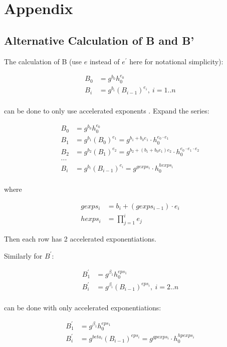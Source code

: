 \documentclass{article}
\begin{document}
\pagebreak

\section{Appendix}
\subsection{Alternative Calculation of B and B'}

The calculation of B (use $e$ instead of $e^{\prime}$ here for notational simplicity):

\begin{align*}
B_{0} &= g^{b_0} h_0^{e_{0}} \\
B_i & =g^{b_{i}}(B_{i-1})^{e_{i}},\ i=1..n \\
\end{align*}

can be done to only use accelerated exponents . Expand the series:

\begin{align*}
B_0 &= g^{b_0} h_0^{e_{0}} \\
B_1 & = g^{b_1}(B_0)^{e_1} = g^{b_1 + b_0 e_1} \cdot h_0^{e_0 \cdot e_1} \\
B_2 & = g^{b_2}(B_1)^{e_2} = g^{b_2 + (b_1 + b_0 e_1) e_2} \cdot h_0^{e_0 \cdot e_1 \cdot e_2} \\
... \\
B_i & = g^{b_i}(B_{i-1})^{e_i} = g^{gexps_i} \cdot h_0^{hexps_i} \\
\end{align*}

where

\begin{align*}
gexps_i &= b_i + (gexps_{i-1}) \cdot e_i \\
hexps_i &= \prod_{j=1}^{i} e_j
\end{align*}

Then each row has 2 accelerated exponentiations.

Similarly for $B^{\prime}$:

\begin{align*}
B_{1}^{\prime} &= g^{\beta_1} h_0^{eps_1} \\
B_{i}^{\prime} &= g^{\beta_{i}}(B_{i-1})^{eps_{i}},\ i=2..n \\
\end{align*}

can be done with only accelerated exponentiations:

\begin{align*}
B_1^{\prime} &= g^{\beta_1} h_0^{eps_1} \\
B_i^{\prime} &= g^{beta_i}(B_{i-1})^{eps_i} = g^{gpexps_i} \cdot h_0^{hpexps_i} \\
\end{align*}
\end{document}
